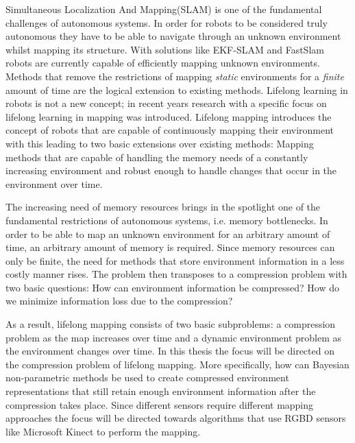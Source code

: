 \documentclass[twoside,hidelinks]{article}
\begin{document}
Simultaneous Localization And Mapping(SLAM) is one of the fundamental challenges of autonomous systems\cite{probRobs}. 
In order for robots to be considered truly autonomous they have to be able to navigate through an unknown environment whilst mapping its structure.
With solutions like EKF-SLAM\cite{ekf} and FastSlam\cite{SLAM} robots are currently capable of efficiently mapping unknown environments. 
Methods that remove the restrictions of mapping \textit{static} environments for a \textit{finite} amount of time are the logical extension to existing methods.
Lifelong learning in robots is not a new concept\cite{liflonglearning}; in recent years research with a specific focus on lifelong learning in mapping\cite{lifelongmaps} was introduced.  Lifelong mapping introduces the concept of robots that are capable of continuously mapping their environment with this leading to two basic extensions over existing methods: Mapping methods that are capable of handling the memory needs of a constantly increasing environment and robust enough to handle changes that occur in the environment over time. 

The increasing need of memory resources brings in the spotlight one of the fundamental restrictions of autonomous systems, i.e. memory bottlenecks. In order to be able to map an unknown environment for an arbitrary amount of time, an arbitrary amount of memory is required. Since memory resources can only be finite, the need for methods that store environment information in a less costly manner rises. The problem then transposes to a compression problem with two basic questions: How can environment information be compressed? How do we minimize information loss due to the compression?

As a result, lifelong mapping consists of two basic subproblems: a compression problem as the map increases over time and a dynamic environment problem as the environment changes over time\cite{aishalong}. In this thesis the focus will be directed on the compression problem of lifelong mapping. More specifically, how can Bayesian non-parametric methods be used to create compressed environment representations that still retain enough environment information after the compression takes place. Since different sensors require different mapping approaches the focus will be directed towards algorithms that use RGBD sensors like Microsoft Kinect to perform the mapping. 
\end{document}
